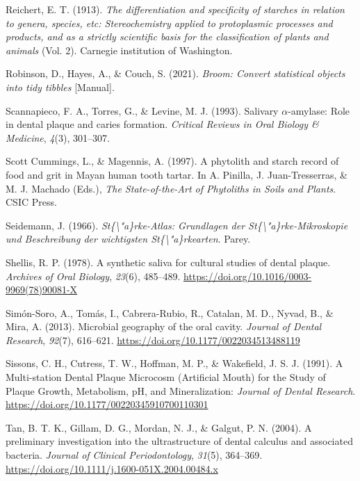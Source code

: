 \documentclass[
  b5paper,
]{book}
\newlength{\cslhangindent}
\newenvironment{CSLReferences}[2] %
 {\begin{list}{}{%
  \setlength{\itemindent}{0pt}
  \setlength{\leftmargin}{0pt}
  \setlength{\parsep}{0pt}
  \ifodd #1
   \setlength{\leftmargin}{\cslhangindent}
   \setlength{\itemindent}{-1\cslhangindent}
  \fi
  \setlength{\itemsep}{#2\baselineskip}}}
 {\end{list}}
\begin{document}
\begin{CSLReferences}{1}{0}
Reichert, E. T. (1913). \emph{The differentiation and specificity of
starches in relation to genera, species, etc: Stereochemistry applied to
protoplasmic processes and products, and as a strictly scientific basis
for the classification of plants and animals} (Vol. 2). {Carnegie
institution of Washington}.

Robinson, D., Hayes, A., \& Couch, S. (2021). \emph{Broom: {Convert}
statistical objects into tidy tibbles} {[}Manual{]}.

Scannapieco, F. A., Torres, G., \& Levine, M. J. (1993). Salivary
{\(\alpha\)}-amylase: Role in dental plaque and caries formation.
\emph{Critical Reviews in Oral Biology \& Medicine}, \emph{4}(3),
301--307.

Scott Cummings, L., \& Magennis, A. (1997). A phytolith and starch
record of food and grit in {Mayan} human tooth tartar. In A. Pinilla, J.
Juan-Tresserras, \& M. J. Machado (Eds.), \emph{The {State-of-the-Art}
of {Phytoliths} in {Soils} and {Plants}}. {CSIC Press}.

Seidemann, J. (1966). \emph{St\{\textbackslash"a\}rke-{Atlas}:
{Grundlagen} der {St}\{\textbackslash"a\}rke-{Mikroskopie} und
{Beschreibung} der wichtigsten {St}\{\textbackslash"a\}rkearten}.
{Parey}.

Shellis, R. P. (1978). A synthetic saliva for cultural studies of dental
plaque. \emph{Archives of Oral Biology}, \emph{23}(6), 485--489.
\url{https://doi.org/10.1016/0003-9969(78)90081-X}

Simón-Soro, A., Tomás, I., Cabrera-Rubio, R., Catalan, M. D., Nyvad, B.,
\& Mira, A. (2013). Microbial geography of the oral cavity.
\emph{Journal of Dental Research}, \emph{92}(7), 616--621.
\url{https://doi.org/10.1177/0022034513488119}

Sissons, C. H., Cutress, T. W., Hoffman, M. P., \& Wakefield, J. S. J.
(1991). A {Multi-station Dental Plaque Microcosm} ({Artificial Mouth})
for the {Study} of {Plaque Growth}, {Metabolism}, {pH}, and
{Mineralization}: \emph{Journal of Dental Research}.
\url{https://doi.org/10.1177/00220345910700110301}

Tan, B. T. K., Gillam, D. G., Mordan, N. J., \& Galgut, P. N. (2004). A
preliminary investigation into the ultrastructure of dental calculus and
associated bacteria. \emph{Journal of Clinical Periodontology},
\emph{31}(5), 364--369.
\url{https://doi.org/10.1111/j.1600-051X.2004.00484.x}


\end{CSLReferences}
\end{document}
